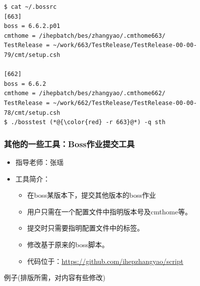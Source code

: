 
\newsavebox{\ZhangYaoBossScript}
\begin{lrbox}{\ZhangYaoBossScript}
\begin{lstlisting}
$ cat ~/.bossrc 
[663]
boss = 6.6.2.p01
cmthome = /ihepbatch/bes/zhangyao/.cmthome663/
TestRelease = ~/work/663/TestRelease/TestRelease-00-00-79/cmt/setup.csh

[662]
boss = 6.6.2
cmthome = /ihepbatch/bes/zhangyao/.cmthome662/
TestRelease = ~/work/662/TestRelease/TestRelease-00-00-78/cmt/setup.csh
$ ./bosstest (*@{\color{red} -r 663}@*) -q sth
\end{lstlisting}
\end{lrbox}

\begin{frame}
    \frametitle{其他的一些工具：Boss作业提交工具}
    \begin{itemize}
        \item 指导老师：张瑶
        \item 工具简介：
            \begin{itemize}
                \item 在boss某版本下，提交其他版本的boss作业
                \item 用户只需在一个配置文件中指明版本号及cmthome等。
                \item 提交时只需要指明配置文件中的标签。
                \item 修改基于原来的boss脚本。
                \item 代码位于：\url{https://github.com/ihepzhangyao/script}
            \end{itemize}
    \end{itemize}
    \begin{block}{例子(排版所需，对内容有些修改)}
        \par\usebox{\ZhangYaoBossScript}
    \end{block}
\end{frame}
